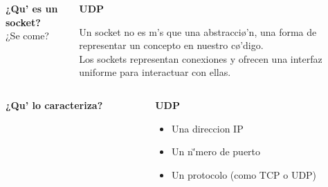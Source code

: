 \documentclass{beamer}
\begin{document}

\begin{frame}
    \begin{columns}
        \begin{column}{0.5\textwidth}
            \begin{center}
                \textbf{¿Qu\e' es un socket?}\\
                ¿Se come?
            \end{center}
        \end{column}
        \begin{column}{0.5\textwidth}
            \textbf{UDP}
            \begin{center}
                Un socket no es m\a's que una abstracci\o'n, una forma de representar un concepto en nuestro c\o'digo.\\
                Los sockets representan conexiones y ofrecen una interfaz uniforme para interactuar con ellas.
            \end{center}
        \end{column}
    \end{columns}
\end{frame}


\begin{frame}
    \begin{columns}
        \begin{column}{0.5\textwidth}
            \begin{center}
                \textbf{¿Qu\e' lo caracteriza?}\\
            \end{center}
        \end{column}
        \begin{column}{0.5\textwidth}
            \textbf{UDP}
            \begin{center}
                \begin{itemize}
                    \item Una direccion IP
                    \item Un n\u'mero de puerto
                    \item Un protocolo (como TCP o UDP)
                \end{itemize}
            \end{center}
        \end{column}
    \end{columns}
\end{frame}
\end{document}
